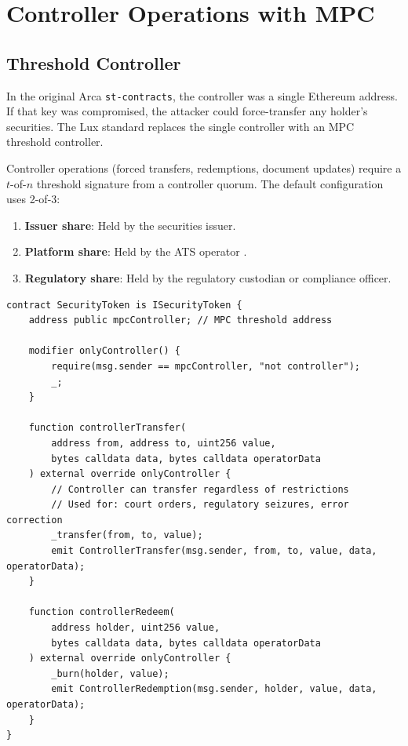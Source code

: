 \documentclass[11pt,a4paper]{article}
\begin{document}
\section{Controller Operations with MPC}\label{sec:controller}

\subsection{Threshold Controller}

In the original Arca \texttt{st-contracts}, the controller was a single Ethereum address. If that key was compromised, the attacker could force-transfer any holder's securities. The Lux standard replaces the single controller with an MPC threshold controller.

Controller operations (forced transfers, redemptions, document updates) require a $t$-of-$n$ threshold signature from a controller quorum. The default configuration uses 2-of-3:

\begin{enumerate}[nosep]
  \item \textbf{Issuer share}: Held by the securities issuer.
  \item \textbf{Platform share}: Held by the ATS operator \cite{lux-ats-architecture}.
  \item \textbf{Regulatory share}: Held by the regulatory custodian or compliance officer.
\end{enumerate}

\begin{lstlisting}[language=Solidity,caption={MPC-controlled forced transfer.}]
contract SecurityToken is ISecurityToken {
    address public mpcController; // MPC threshold address

    modifier onlyController() {
        require(msg.sender == mpcController, "not controller");
        _;
    }

    function controllerTransfer(
        address from, address to, uint256 value,
        bytes calldata data, bytes calldata operatorData
    ) external override onlyController {
        // Controller can transfer regardless of restrictions
        // Used for: court orders, regulatory seizures, error correction
        _transfer(from, to, value);
        emit ControllerTransfer(msg.sender, from, to, value, data, operatorData);
    }

    function controllerRedeem(
        address holder, uint256 value,
        bytes calldata data, bytes calldata operatorData
    ) external override onlyController {
        _burn(holder, value);
        emit ControllerRedemption(msg.sender, holder, value, data, operatorData);
    }
}
\end{lstlisting}
\end{document}
